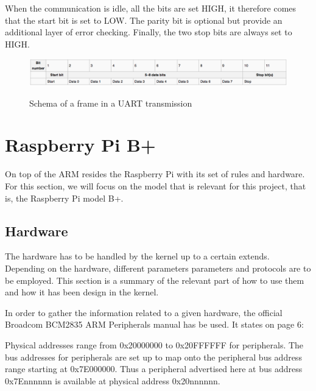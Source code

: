 When the communication is idle, all the bits are set HIGH, it therefore comes that the start bit is set to LOW. The parity bit is optional but provide an additional layer of error checking. Finally, the two stop bits are always set to HIGH.


\begin{figure}[H]
\begin{center}
\includegraphics[width=1\textwidth]{includes/figures/chapter2_uart_framing.png}  \\[0.5 cm]
\caption{Schema of a frame in a UART transmission}
\end{center}
\label{fig:chapter2_uart_framing}
\end{figure}

 



\section{Raspberry Pi B+}\label{chapter2_raspberry_pi}
On top of the ARM resides the Raspberry Pi with its set of rules and hardware. For this section, we will focus on the model that is relevant for this project, that is, the Raspberry Pi model B+.

\subsection{Hardware}
The hardware has to be handled by the kernel up to a certain extends. Depending on the hardware, different parameters parameters and protocols are to be employed. This section is a summary of the relevant part of how to use them and how it has been design in the kernel.

In order to gather the information related to a given hardware, the official Broadcom BCM2835 ARM Peripherals manual\cite{arm_peripherals_manual} has be used. It states on page 6:

\begin{displayquote}
Physical addresses range from 0x20000000 to 0x20FFFFFF for peripherals. The bus addresses for peripherals are set up to map onto the peripheral bus address range starting at 0x7E000000. Thus a peripheral advertised here at bus address 0x7Ennnnnn is available at physical address 0x20nnnnnn.
\end{displayquote}

